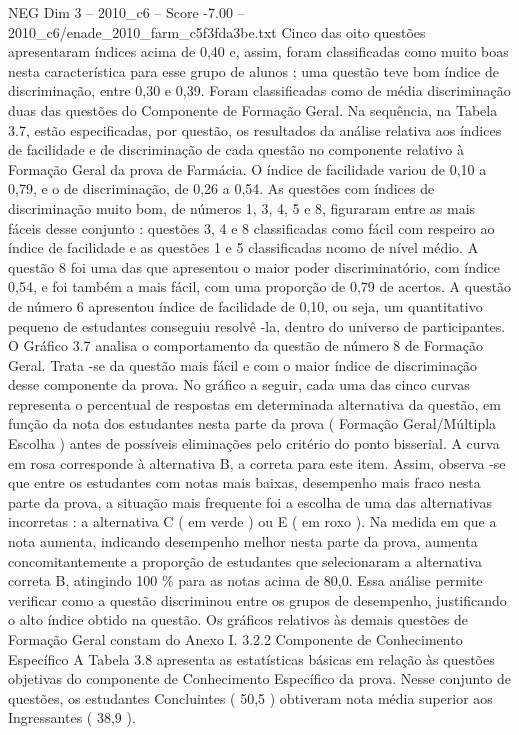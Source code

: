 \begin{textsample}{NEG Dim 3 – 2010\_c6 – Score -7.00 – 2010\_c6/enade\_2010\_farm\_c5f3fda3be.txt}
Cinco das oito questões apresentaram índices acima de 0,40 e, assim, foram classificadas como muito boas nesta característica para esse grupo de alunos ; uma questão teve bom índice de discriminação, entre 0,30 e 0,39.
Foram classificadas como de média discriminação duas das questões do Componente de Formação Geral.
Na sequência, na Tabela 3.7, estão especificadas, por questão, os resultados da análise relativa aos índices de facilidade e de discriminação de cada questão no componente relativo à Formação Geral da prova de Farmácia.
O índice de facilidade variou de 0,10 a 0,79, e o de discriminação, de 0,26 a 0,54.
As questões com índices de discriminação muito bom, de números 1, 3, 4, 5 e 8, figuraram entre as mais fáceis desse conjunto : questões 3, 4 e 8 classificadas como fácil com respeiro ao índice de facilidade e as questões 1 e 5 classificadas ncomo de nível médio.
A questão 8 foi uma das que apresentou o maior poder discriminatório, com índice 0,54, e foi também a mais fácil, com uma proporção de 0,79 de acertos.
A questão de número 6 apresentou índice de facilidade de 0,10, ou seja, um quantitativo pequeno de estudantes conseguiu resolvê -la, dentro do universo de participantes.
O Gráfico 3.7 analisa o comportamento da questão de número 8 de Formação Geral.
Trata -se da questão mais fácil e com o maior índice de discriminação desse componente da prova.
No gráfico a seguir, cada uma das cinco curvas representa o percentual de respostas em determinada alternativa da questão, em função da nota dos estudantes nesta parte da prova ( Formação Geral/Múltipla Escolha ) antes de possíveis eliminações pelo critério do ponto bisserial.
A curva em rosa corresponde à alternativa B, a correta para este item.
Assim, observa -se que entre os estudantes com notas mais baixas, desempenho mais fraco nesta parte da prova, a situação mais frequente foi a escolha de uma das alternativas incorretas : a alternativa C ( em verde ) ou E ( em roxo ).
Na medida em que a nota aumenta, indicando desempenho melhor nesta parte da prova, aumenta concomitantemente a proporção de estudantes que selecionaram a alternativa correta B, atingindo 100 \% para as notas acima de 80,0.
Essa análise permite verificar como a questão discriminou entre os grupos de desempenho, justificando o alto índice obtido na questão.
Os gráficos relativos às demais questões de Formação Geral constam do Anexo I. 3.2.2 Componente de Conhecimento Específico A Tabela 3.8 apresenta as estatísticas básicas em relação às questões objetivas do componente de Conhecimento Específico da prova.
Nesse conjunto de questões, os estudantes Concluintes ( 50,5 ) obtiveram nota média superior aos Ingressantes ( 38,9 ).

\end{textsample}
